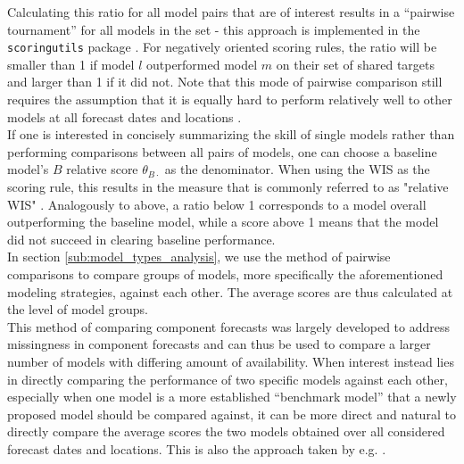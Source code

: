 Calculating this ratio for all model pairs that are of interest results in a ``pairwise tournament'' for all models in the set - this approach is implemented in the \texttt{scoringutils} package \citep{bosse_epiforecastsscoringutils_2022}. For negatively oriented scoring rules, the ratio will be smaller than 1 if model $l$ outperformed model $m$ on their set of shared targets and larger than 1 if it did not. Note that this mode of pairwise comparison still requires the assumption that it is equally hard to perform relatively well to other models at all forecast dates and locations \citep{cramer_evaluation_2022}.\\
If one is interested in concisely summarizing the skill of single models rather than performing comparisons between all pairs of models, one can choose a baseline model's $B$ relative score $\theta_{B\cdot}$ as the denominator. When using the WIS as the scoring rule, this results in the measure that is commonly referred to as "relative WIS" \citep{cramer_evaluation_2022}. Analogously to above, a ratio below 1 corresponds to a model overall outperforming the baseline model, while a score above 1 means that the model did not succeed in clearing baseline performance.\\
In section \ref{sub:model_types_analysis}, we use the method of pairwise comparisons to compare groups of models, more specifically the aforementioned modeling strategies, against each other. The average scores are thus calculated at the level of model groups.\\
This method of comparing component forecasts was largely developed to address missingness in component forecasts and can thus be used to compare a larger number of models with differing amount of availability. When interest instead lies in directly comparing the performance of two specific models against each other, especially when one model is a more established ``benchmark model'' that a newly proposed model should be compared against, it can be more direct and natural to directly compare the average scores the two models obtained over all considered forecast dates and locations. This is also the approach taken by e.g. \cite{bosse_comparing_2021-1}.\\
